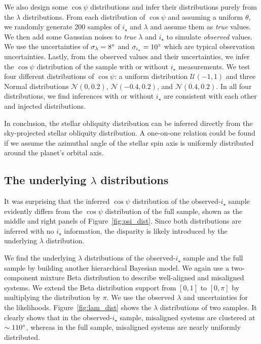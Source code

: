 \documentclass[twocolumn,times]{aastex631}
\begin{document}
We also design some $\cos{\psi}$ distributions and infer their distributions purely from the $\lambda$ distributions. From each distribution of $\cos{\psi}$ and assuming a uniform $\theta$, we randomly generate 200 samples of $i_\star$ and $\lambda$ and assume them as \emph{true} values. We then add some Gaussian noises to \emph{true} $\lambda$ and $i_\star$ to simulate \emph{observed} values. We use the uncertainties of $\sigma_{\lambda} = 8\mbox{$^\circ$}$ and $\sigma_{i_\star} = 10\mbox{$^\circ$}$ which are typical observation uncertainties. Lastly, from the observed values and their uncertainties, we infer the $\cos{\psi}$ distribution of the sample with or without $i_\star$ measurements.
We test four different distributions of $\cos{\psi}$: a uniform distribution $\mathcal{U}(-1,1)$ and three Normal distributions $\mathcal{N}(0,0.2)$, $\mathcal{N}(-0.4,0.2)$, and $\mathcal{N}(0.4,0.2)$.
In all four distributions, we find inferences with or without $i_\star$ are consistent with each other and injected distributions.

In conclusion, the stellar obliquity distribution can be inferred directly from the sky-projected stellar obliquity distribution. A one-on-one relation could be found if we assume the azimuthal angle of the stellar spin axis is uniformly distributed around the planet's orbital axis.

\subsection{The underlying \texorpdfstring{$\lambda$}{lambda} distributions}

It was surprising that the inferred $\cos{\psi}$ distribution of the observed-$i_\star$ sample evidently differs from the $\cos{\psi}$ distribution of the full sample, shown as the middle and right panels of Figure~\ref{fig:psi_dist}. Since both distributions are inferred with no $i_\star$ information, the disparity is likely introduced by the underlying $\lambda$ distribution.

We find the underlying $\lambda$ distributions of the observed-$i_\star$ sample and the full sample by building another hierarchical Bayesian model. We again use a two-component mixture Beta distribution to describe well-aligned and misaligned systems. We extend the Beta distribution support from $[0,1]$ to $[0,\pi]$ by multiplying the distribution by $\pi$. We use the observed $\lambda$ and uncertainties for the likelihoods. Figure~\ref{fig:lam_dist} shows the $\lambda$ distributions of two samples. It clearly shows that in the observed-$i_\star$ sample, misaligned systems are clustered at $\sim 110\mbox{$^\circ$}$, whereas in the full sample, misaligned systems are nearly uniformly distributed. 
\end{document}
